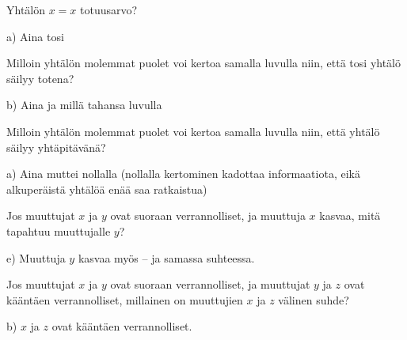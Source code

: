 \begin{tehtava}
Yhtälön $x = x$ totuusarvo?
\begin{vastaus}
a) Aina tosi
\end{vastaus}
\end{tehtava}

\begin{tehtava}
Milloin yhtälön molemmat puolet voi kertoa samalla luvulla niin, että tosi yhtälö säilyy totena?
	\begin{vastaus}
b) Aina ja millä tahansa luvulla
	\end{vastaus}
\end{tehtava}

\begin{tehtava}
Milloin yhtälön molemmat puolet voi kertoa samalla luvulla niin, että yhtälö säilyy yhtäpitävänä?
\begin{vastaus}
a) Aina muttei nollalla (nollalla kertominen kadottaa informaatiota, eikä alkuperäistä yhtälöä enää saa ratkaistua)
\end{vastaus}
\end{tehtava}

\begin{tehtava}
Jos muuttujat $x$ ja $y$ ovat suoraan verrannolliset, ja muuttuja $x$ kasvaa, mitä tapahtuu muuttujalle $y$?
\begin{vastaus}
e) Muuttuja $y$ kasvaa myös -- ja samassa suhteessa.
\end{vastaus}
\end{tehtava}

\begin{tehtava}
Jos muuttujat $x$ ja $y$ ovat suoraan verrannolliset, ja muuttujat $y$ ja $z$ ovat kääntäen verrannolliset, millainen on muuttujien $x$ ja $z$ välinen suhde?
	\begin{vastaus}
b) $x$ ja $z$ ovat kääntäen verrannolliset.
	\end{vastaus}
\end{tehtava}

